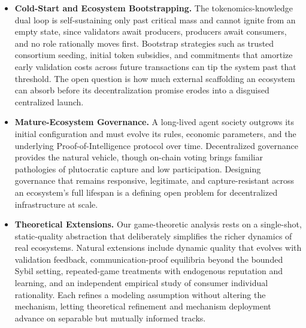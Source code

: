 \begin{itemize}[leftmargin=1.5em, itemsep=4pt, topsep=2pt]
    \item \textbf{Cold-Start and Ecosystem Bootstrapping.} The tokenomics-knowledge dual loop is self-sustaining only past critical mass and cannot ignite from an empty state, since validators await producers, producers await consumers, and no role rationally moves first. Bootstrap strategies such as trusted consortium seeding, initial token subsidies, and commitments that amortize early validation costs across future transactions can tip the system past that threshold. The open question is how much external scaffolding an ecosystem can absorb before its decentralization promise erodes into a disguised centralized launch.

    \item \textbf{Mature-Ecosystem Governance.} A long-lived agent society outgrows its initial configuration and must evolve its rules, economic parameters, and the underlying Proof-of-Intelligence protocol over time. Decentralized governance provides the natural vehicle, though on-chain voting brings familiar pathologies of plutocratic capture and low participation. Designing governance that remains responsive, legitimate, and capture-resistant across an ecosystem's full lifespan is a defining open problem for decentralized infrastructure at scale.

    \item \textbf{Theoretical Extensions.} Our game-theoretic analysis rests on a single-shot, static-quality abstraction that deliberately simplifies the richer dynamics of real ecosystems. Natural extensions include dynamic quality that evolves with validation feedback, communication-proof equilibria beyond the bounded Sybil setting, repeated-game treatments with endogenous reputation and learning, and an independent empirical study of consumer individual rationality. Each refines a modeling assumption without altering the mechanism, letting theoretical refinement and mechanism deployment advance on separable but mutually informed tracks.
\end{itemize}
